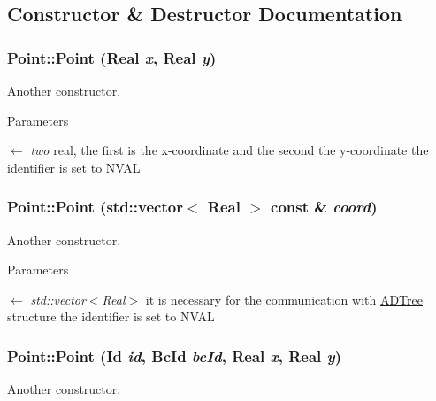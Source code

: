 \subsection{Constructor \& Destructor Documentation}
\hypertarget{classPoint_a034584b85d239bdd5bd38ab80ab9aee6}{
\subsubsection[{Point}]{\setlength{\rightskip}{0pt plus 5cm}Point::Point (Real {\em x}, \/  Real {\em y})}}
\label{classPoint_a034584b85d239bdd5bd38ab80ab9aee6}
Another constructor.


\begin{DoxyParams}{Parameters}
\item[\mbox{$\leftarrow$} {\em two}]real, the first is the x-\/coordinate and the second the y-\/coordinate the identifier is set to NVAL \end{DoxyParams}
\hypertarget{classPoint_ae0b5d58f061678fef344fffa0160ddc3}{
\subsubsection[{Point}]{\setlength{\rightskip}{0pt plus 5cm}Point::Point (std::vector$<$ Real $>$ const \& {\em coord})}}
\label{classPoint_ae0b5d58f061678fef344fffa0160ddc3}
Another constructor.


\begin{DoxyParams}{Parameters}
\item[\mbox{$\leftarrow$} {\em std::vector$<$Real$>$}]it is necessary for the communication with \hyperlink{classADTree}{ADTree} structure the identifier is set to NVAL \end{DoxyParams}
\hypertarget{classPoint_ac78e6a41f2d39366526d0bc0f1203efd}{
\subsubsection[{Point}]{\setlength{\rightskip}{0pt plus 5cm}Point::Point (Id {\em id}, \/  BcId {\em bcId}, \/  Real {\em x}, \/  Real {\em y})}}
\label{classPoint_ac78e6a41f2d39366526d0bc0f1203efd}
Another constructor.


